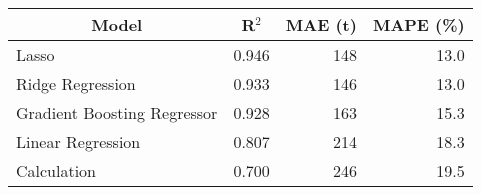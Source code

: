 
\begin{tabular}[t]{lrrr}
\toprule
\multicolumn{1}{c}{Model} & \multicolumn{1}{c}{R$^2$} & \multicolumn{1}{c}{MAE (t)} & \multicolumn{1}{c}{MAPE (\%)}\\
\midrule
Lasso & 0.946 & 148 & 13.0\\
Ridge Regression & 0.933 & 146 & 13.0\\
Gradient Boosting Regressor & 0.928 & 163 & 15.3\\
Linear Regression & 0.807 & 214 & 18.3\\
Calculation & 0.700 & 246 & 19.5\\
\bottomrule
\end{tabular}
